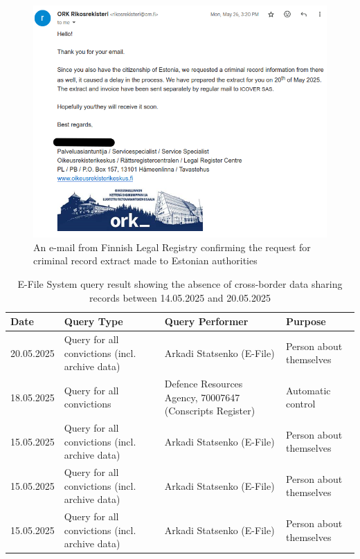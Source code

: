 \begin{figure}[H]
\centering
\includegraphics[width=450px]{english/figures/Screenshot from 2025-08-09 11-59-33.png}
\caption{An e-mail from Finnish Legal Registry confirming the request for criminal record extract made to Estonian authorities}
\label{fig:finnish-legal-registry-email}
\end{figure}

\begin{table}[H]
\centering
\begin{small}
\begin{tabular}{|p{2.5cm}|p{4.5cm}|p{4cm}|p{2.5cm}|}
\hline
\textbf{Date} & \textbf{Query Type} & \textbf{Query Performer} & \textbf{Purpose} \\
\hline
20.05.2025 & Query for all convictions (incl. archive data) & Arkadi Statsenko (E-File) & Person about themselves \\
\hline
18.05.2025 & Query for all convictions & Defence Resources Agency, 70007647 (Conscripts Register) & Automatic control \\
\hline
15.05.2025 & Query for all convictions (incl. archive data) & Arkadi Statsenko (E-File) & Person about themselves \\
\hline
15.05.2025 & Query for all convictions (incl. archive data) & Arkadi Statsenko (E-File) & Person about themselves \\
\hline
15.05.2025 & Query for all convictions (incl. archive data) & Arkadi Statsenko (E-File) & Person about themselves \\
\hline
\end{tabular}
\end{small}
\caption{E-File System query result showing the absence of cross-border data sharing records between 14.05.2025 and 20.05.2025}
\label{tab:e-file-queries}
\end{table}

